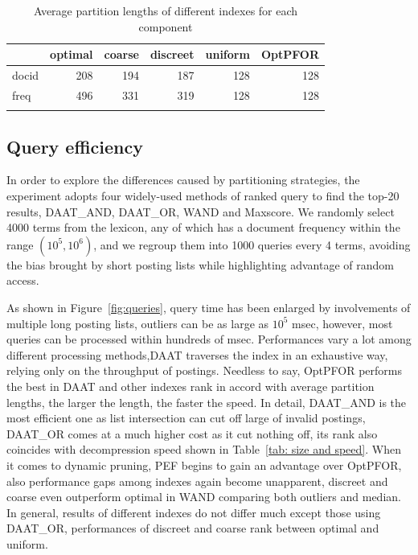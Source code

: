 \documentclass[runningheads,a4paper]{llncs}
\begin{document}
\begin{table}
	\centering
	\caption{Average partition lengths of different indexes for each component}
	\renewcommand{\arraystretch}{1.0}
	\begin{tabular}{@{}l*{5}{r}} \toprule
		& \multicolumn{1}{c}{optimal} & \multicolumn{1}{c}{coarse} & \multicolumn{1}{c}{discreet} & \multicolumn{1}{c}{uniform}& \multicolumn{1}{c}{OptPFOR} \\ \midrule
		docid & 208 & 194 & 187 & 128 & 128 \\
		freq  & 496 & 331 & 319 & 128 & 128 \\
		\bottomrule
		\label{tab: chunk size}
	\end{tabular}
\end{table}

\subsection{Query efficiency}

In order to explore the differences caused by partitioning strategies, the experiment adopts four widely-used methods of ranked query to find the top-20 results, DAAT\_AND, DAAT\_OR, WAND and Maxscore. We randomly select 4000 terms from the lexicon, any of which has a document frequency within the range $(10^{5},10^{6})$, and we regroup them into 1000 queries every 4 terms, avoiding the bias brought by short posting lists while highlighting advantage of random access.

As shown in Figure~\ref{fig:queries}, query time has been enlarged by involvements of multiple long posting lists, outliers can be as large as $10^{5}$ msec, however, most queries can be processed within hundreds of msec. Performances vary a lot among different processing methods,DAAT traverses the index in an exhaustive way, relying only on the throughput of postings. Needless to say, OptPFOR performs the best in DAAT and other indexes rank in accord with average partition lengths, the larger the length, the faster the speed. In detail, DAAT\_AND is the most efficient one as list intersection can cut off large of invalid postings, DAAT\_OR comes at a much higher cost as it cut nothing off, its rank also coincides with decompression speed shown in Table~\ref{tab: size and speed}. When it comes to dynamic pruning, PEF begins to gain an advantage over OptPFOR, also performance gaps among indexes again become unapparent, discreet and coarse even outperform optimal in WAND comparing both outliers and median. In general, results of different indexes do not differ much except those using DAAT\_OR, performances of discreet and coarse rank between optimal and uniform.
\end{document}
